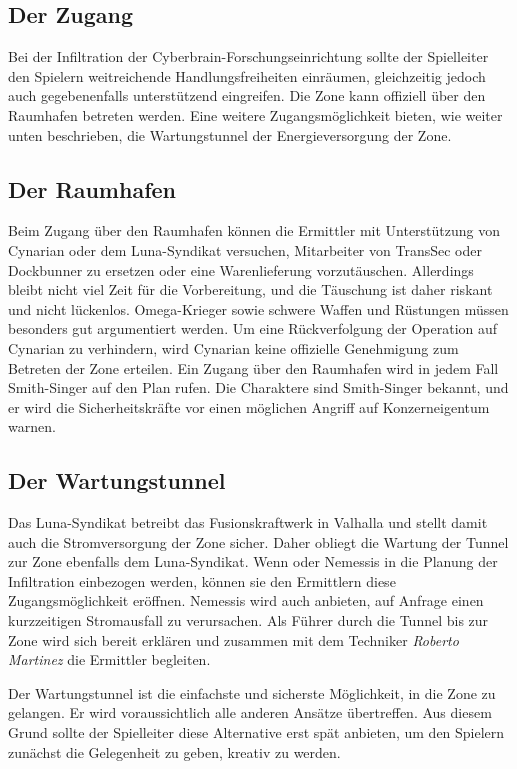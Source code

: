 \subsection{Der Zugang} 
Bei der Infiltration der Cyberbrain-Forschungseinrichtung sollte der Spielleiter den Spielern weitreichende Handlungsfreiheiten einräumen, gleichzeitig jedoch auch gegebenenfalls unterstützend eingreifen. Die Zone kann offiziell über den Raumhafen betreten werden. Eine weitere Zugangsmöglichkeit bieten, wie weiter unten beschrieben, die Wartungstunnel der Energieversorgung der Zone.

\subsection{Der Raumhafen} 
Beim Zugang über den Raumhafen können die Ermittler mit Unterstützung von Cynarian oder dem Luna-Syndikat versuchen, Mitarbeiter von TransSec oder Dockbunner zu ersetzen oder eine Warenlieferung vorzutäuschen. Allerdings bleibt nicht viel Zeit für die Vorbereitung, und die Täuschung ist daher riskant und nicht lückenlos. Omega-Krieger sowie schwere Waffen und Rüstungen müssen besonders gut argumentiert werden. Um eine Rückverfolgung der Operation auf Cynarian zu verhindern, wird Cynarian keine offizielle Genehmigung zum Betreten der Zone erteilen. Ein Zugang über den Raumhafen wird in jedem Fall Smith-Singer auf den Plan rufen. Die Charaktere sind Smith-Singer bekannt, und er wird die Sicherheitskräfte vor einen möglichen Angriff auf Konzerneigentum warnen. 

\subsection{Der Wartungstunnel} 
Das Luna-Syndikat betreibt das Fusionskraftwerk in Valhalla und stellt damit auch die Stromversorgung der Zone sicher. Daher obliegt die Wartung der Tunnel zur Zone ebenfalls dem Luna-Syndikat. Wenn \xl{} oder Nemessis in die Planung der Infiltration einbezogen werden, können sie den Ermittlern diese Zugangsmöglichkeit eröffnen. Nemessis wird auch anbieten, auf Anfrage einen kurzzeitigen Stromausfall zu verursachen. Als Führer durch die Tunnel bis zur Zone wird sich \xl{} bereit erklären und zusammen mit dem Techniker \emph{Roberto Martinez} die Ermittler begleiten.

\begin{remarks}
	Der Wartungstunnel ist die einfachste und sicherste Möglichkeit, in die Zone zu gelangen. Er wird voraussichtlich alle anderen Ansätze übertreffen. Aus diesem Grund sollte der Spielleiter diese Alternative erst spät anbieten, um den Spielern zunächst die Gelegenheit zu geben, kreativ zu werden.
\end{remarks}

